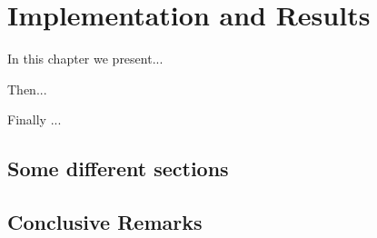 \chapter{Implementation and Results}
\label{chap:Implementation}
\pagestyle{plain}
\vspace{0.5cm}

\noindent In this chapter we present...

Then...

Finally ...


\section{Some different sections}

\section{Conclusive Remarks}
